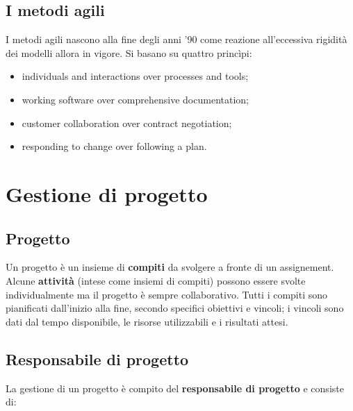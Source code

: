\documentclass[a4paper]{article}
\begin{document}
		
	\subsection{I metodi agili}

		
I metodi agili nascono alla fine degli anni '90 come reazione all'eccessiva rigidità dei modelli allora in vigore. Si basano su quattro princìpi:
		
	\begin{itemize}
		
			
	\item individuals and interactions over processes and tools;
			
	\item working software over comprehensive documentation;
			
	\item customer collaboration over contract negotiation;
			
	\item responding to change over following a plan.
		
	\end{itemize}

	


		
	\section{Gestione di progetto}


		
	\subsection{Progetto}

		
Un progetto è un insieme di \textbf{compiti} da svolgere a fronte di un assignement. Alcune \textbf{attività} (intese come insiemi di compiti) possono essere svolte individualmente ma il progetto è sempre collaborativo. Tutti i compiti sono pianificati dall'inizio alla fine, secondo specifici obiettivi e vincoli; i vincoli sono dati dal tempo disponibile, le risorse utilizzabili e i risultati attesi.

		
	\subsection{Responsabile di progetto}

		
La gestione di un progetto è compito del \textbf{responsabile di progetto} e consiste di:
		
\end{document}
